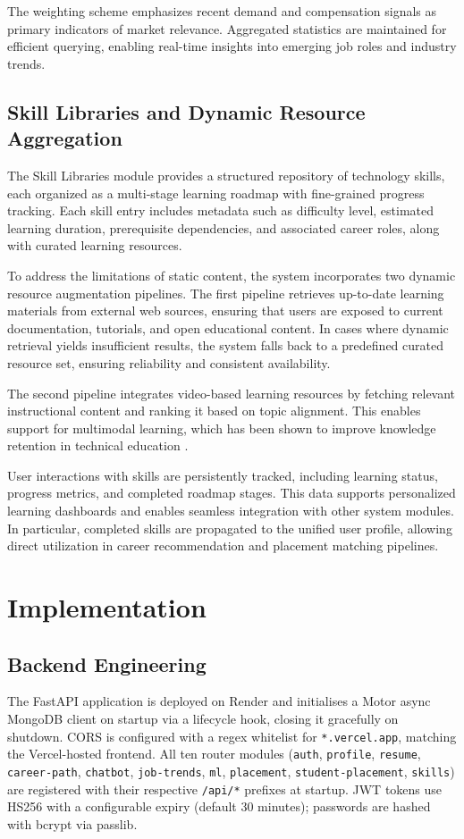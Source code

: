 \documentclass[conference]{IEEEtran}
\begin{document}
The weighting scheme emphasizes recent demand and compensation signals
as primary indicators of market relevance. Aggregated statistics are
maintained for efficient querying, enabling real-time insights into
emerging job roles and industry trends.

\subsection{Skill Libraries and Dynamic Resource Aggregation}
The Skill Libraries module provides a structured repository of
technology skills, each organized as a multi-stage learning roadmap
with fine-grained progress tracking. Each skill entry includes metadata
such as difficulty level, estimated learning duration, prerequisite
dependencies, and associated career roles, along with curated learning
resources.

To address the limitations of static content, the system incorporates
two dynamic resource augmentation pipelines. The first pipeline
retrieves up-to-date learning materials from external web sources,
ensuring that users are exposed to current documentation, tutorials,
and open educational content. In cases where dynamic retrieval yields
insufficient results, the system falls back to a predefined curated
resource set, ensuring reliability and consistent availability.

The second pipeline integrates video-based learning resources by
fetching relevant instructional content and ranking it based on topic
alignment. This enables support for multimodal learning, which has been
shown to improve knowledge retention in technical education
\cite{li2025}.

User interactions with skills are persistently tracked, including
learning status, progress metrics, and completed roadmap stages. This
data supports personalized learning dashboards and enables seamless
integration with other system modules. In particular, completed skills
are propagated to the unified user profile, allowing direct utilization
in career recommendation and placement matching pipelines.

\section{Implementation}

\subsection{Backend Engineering}
The FastAPI application is deployed on Render and initialises a Motor
async MongoDB client on startup via a lifecycle hook, closing it
gracefully on shutdown. CORS is configured with a regex whitelist
for \texttt{*.vercel.app}, matching the Vercel-hosted frontend. All
ten router modules (\texttt{auth}, \texttt{profile},
\texttt{resume}, \texttt{career-path}, \texttt{chatbot},
\texttt{job-trends}, \texttt{ml}, \texttt{placement},
\texttt{student-placement}, \texttt{skills}) are registered with
their respective \texttt{/api/*} prefixes at startup. JWT tokens use
HS256 with a configurable expiry (default 30 minutes); passwords are
hashed with bcrypt via passlib.
\end{document}

